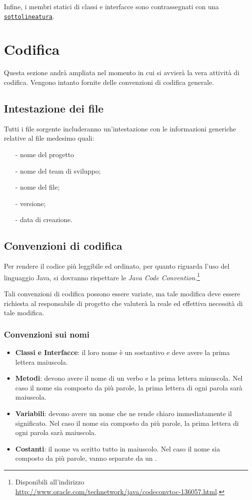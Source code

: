 {Infine, i membri statici di classi e interfacce sono contrassegnati con una \underline{\texttt{sottolineatura}}.

\clearpage
\section{Codifica}
Questa sezione andrà ampliata nel momento in cui si avvierà la vera attività di codifica. Vengono intanto fornite delle convenzioni di codifica generale.

\subsection{Intestazione dei file}
Tutti i file sorgente includeranno un'intestazione con le informazioni generiche relative al file medesimo quali:
\begin{itemize}[noitemsep,nolistsep]
\item[-] nome del progetto
\item[-] nome del team di sviluppo;
\item[-] nome del file;
\item[-] versione;
\item[-] data di creazione.
\end{itemize}

\subsection{Convenzioni di codifica}
Per rendere il codice più leggibile ed ordinato, per quanto riguarda l'uso del linguaggio Java, si dovranno rispettare le \textit{Java Code Convention}.\footnote{%
Disponibili all'indirizzo \url{http://www.oracle.com/technetwork/java/codeconvtoc-136057.html}.
}

Tali convenzioni di codifica possono essere variate, ma tale modifica deve essere richiesta al responsabile di progetto che valuterà la reale ed effettiva necessità di tale modifica.

\subsubsection{Convenzioni sui nomi}
\begin{itemize}
\item \textbf{Classi e Interfacce}: il loro nome è un sostantivo e deve avere la prima lettera maiuscola.
\item \textbf{Metodi}: devono avere il nome di un verbo e la prima lettera minuscola. Nel caso il nome sia composto da più parole, la prima lettera di ogni parola sarà maiuscola.
\item \textbf{Variabili}: devono avere un nome che ne rende chiaro immediatamente il significato. Nel caso il nome sia composto da più parole, la prima lettera di ogni parola sarà maiuscola.
\item \textbf{Costanti}: il nome va scritto tutto in maiuscolo. Nel caso il nome sia composto da più parole, vanno separate da un .


\end{itemize}}
